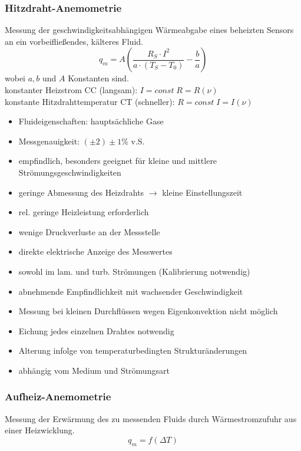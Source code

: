 \subsubsection{Hitzdraht-Anemometrie}
Messung der geschwindigkeitsabhängigen Wärmeabgabe eines beheizten Sensors an ein vorbeifließendes, kälteres Fluid.
$$q_m = A \left( \frac{R_S \cdot I^2}{a\cdot (T_S-T_0)}-\frac{b}{a}\right)$$
wobei $a,b$ und $A$ Konstanten sind.\\
konstanter Heizstrom CC (langsam): $I=const \; R=R(\nu)$\\
konstante Hitzdrahttemperatur CT (schneller): $R=const \; I=I(\nu)$
\begin{itemize}
\item Fluideigenschaften: hauptsächliche Gase
\item Messgenauigkeit: $(\pm 2) \pm 1 \%$ v.S.
\end{itemize}
\begin{itemize}[label=$+$]
\item empfindlich, besonders geeignet für kleine und mittlere Strömungsgeschwindigkeiten
\item geringe Abmessung des Heizdrahts $\rightarrow$ kleine Einstellungszeit
\item rel. geringe Heizleistung erforderlich
\item wenige Druckverluste an der Messstelle
\item direkte elektrische Anzeige des Messwertes
\item sowohl im lam. und turb. Strömungen (Kalibrierung notwendig)
\end{itemize}
\begin{itemize}[label=$-$]
\item abnehmende Empfindlichkeit mit wachsender Geschwindigkeit
\item Messung bei kleinen Durchflüssen wegen Eigenkonvektion nicht möglich
\item Eichung jedes einzelnen Drahtes notwendig
\item Alterung infolge von temperaturbedingten Strukturänderungen
\item abhängig vom Medium und Strömungsart
\end{itemize}
\subsubsection{Aufheiz-Anemometrie}
Messung der Erwärmung des zu messenden Fluids durch Wärmestromzufuhr aus einer Heizwicklung.
$$q_m=f(\Delta T)$$





